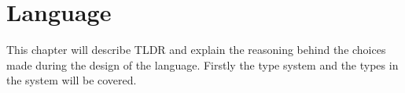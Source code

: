 \chapter{Language}\label{part:design}

This chapter will describe TLDR and explain the reasoning behind the choices made during the design of the language. Firstly the type system and the types in the system will be covered.












